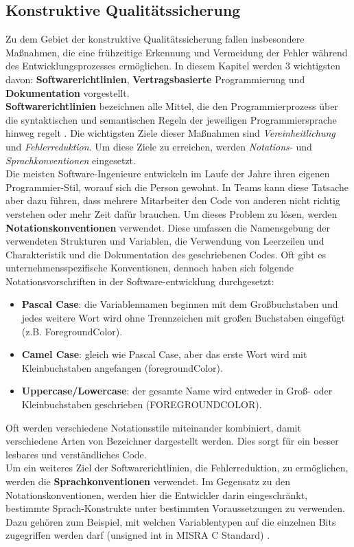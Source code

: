 \subsection{Konstruktive Qualitätssicherung}
\label{subsec:qualitaetsmanagement:konstruktive}
Zu dem Gebiet der konstruktive Qualitätssicherung fallen insbesondere Maßnahmen, die eine frühzeitige Erkennung und Vermeidung der Fehler während des Entwicklungsprozesses ermöglichen. In diesem Kapitel werden 3 wichtigsten davon: 
\textbf{Softwarerichtlinien}, \textbf{Vertragsbasierte} Programmierung und \textbf{Dokumentation} vorgestellt.  
\\\textbf{Softwarerichtlinien} bezeichnen alle Mittel, die den Programmierprozess über die syntaktischen und semantischen Regeln der jeweiligen Programmiersprache hinweg regelt \cite[65]{Hoff:2008:Software:}. 
Die wichtigsten Ziele dieser Maßnahmen sind \textit{Vereinheitlichung} und \textit{Fehlerreduktion}. Um diese Ziele zu erreichen, werden \textit{Notations-} und \textit{Sprachkonventionen} eingesetzt.  
\\

Die meisten Software-Ingenieure entwickeln im Laufe der Jahre ihren eigenen Programmier-Stil, worauf sich die Person gewohnt. In Teams kann diese Tatsache aber dazu führen, dass mehrere Mitarbeiter den Code von anderen nicht richtig verstehen oder mehr Zeit dafür brauchen. 
Um dieses Problem zu lösen, werden \textbf{Notationskonventionen} verwendet. Diese umfassen die Namensgebung der verwendeten Strukturen und Variablen, die Verwendung von Leerzeilen und Charakteristik und die Dokumentation des geschriebenen Codes. 
Oft gibt es unternehmensspezifische Konventionen, dennoch haben sich folgende Notationsvorschriften in der Software-entwicklung durchgesetzt:
\begin{itemize}
    \item \textbf{Pascal Case}: die Variablennamen beginnen mit dem Großbuchstaben und jedes weitere Wort wird ohne Trennzeichen mit großen Buchstaben eingefügt (z.B. ForegroundColor). 
    \item \textbf{Camel Case}: gleich wie Pascal Case, aber das erste Wort wird mit Kleinbuchstaben angefangen (foregroundColor).
    \item \textbf{Uppercase/Lowercase}: der gesamte Name wird entweder in Groß- oder Kleinbuchstaben geschrieben (FOREGROUNDCOLOR).
\end{itemize}
Oft werden verschiedene Notationsstile miteinander kombiniert, damit verschiedene Arten von Bezeichner dargestellt werden. Dies sorgt für ein besser lesbares und verständliches Code. 
\\Um ein weiteres Ziel der Softwarerichtlinien, die Fehlerreduktion, zu ermöglichen, werden die \textbf{Sprachkonventionen} verwendet. 
Im Gegensatz zu den Notationskonventionen, werden hier die Entwickler darin eingeschränkt, bestimmte Sprach-Konstrukte unter bestimmten Voraussetzungen zu verwenden. Dazu gehören zum Beispiel, mit welchen Variablentypen auf die einzelnen Bits zugegriffen werden darf (unsigned int in MISRA C Standard) \cite[76]{Hoff:2008:Software:} \cite{Misr:02122022:MISRA:}.   
\\

